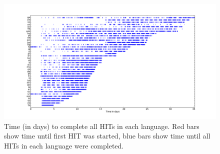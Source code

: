 \documentclass[11pt]{article}
\begin{document}
\begin{figure}[h]
\centering
\includegraphics[height=\linewidth,angle=270]{figures/completiontime}
\caption{Time (in days) to complete all HITs in each language. Red bars show time until first HIT was started,
 blue bars show time until all HITs in each language were completed.}
\label{completion-time}
\end{figure}



\end{document}
